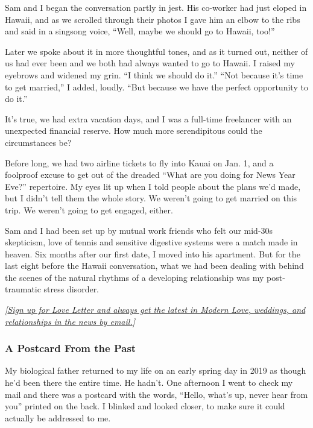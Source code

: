 Sam and I began the conversation partly in jest. His co-worker had just
eloped in Hawaii, and as we scrolled through their photos I gave him an
elbow to the ribs and said in a singsong voice, ``Well, maybe we should
go to Hawaii, too!''

Later we spoke about it in more thoughtful tones, and as it turned out,
neither of us had ever been and we both had always wanted to go to
Hawaii. I raised my eyebrows and widened my grin. ``I think we should do
it.'' ``Not because it's time to get married,'' I added, loudly. ``But
because we have the perfect opportunity to do it.''

It's true, we had extra vacation days, and I was a full-time freelancer
with an unexpected financial reserve. How much more serendipitous could
the circumstances be?

Before long, we had two airline tickets to fly into Kauai on Jan. 1, and
a foolproof excuse to get out of the dreaded ``What are you doing for
News Year Eve?'' repertoire. My eyes lit up when I told people about the
plans we'd made, but I didn't tell them the whole story. We weren't
going to get married on this trip. We weren't going to get engaged,
either.

Sam and I had been set up by mutual work friends who felt our mid-30s
skepticism, love of tennis and sensitive digestive systems were a match
made in heaven. Six months after our first date, I moved into his
apartment. But for the last eight before the Hawaii conversation, what
we had been dealing with behind the scenes of the natural rhythms of a
developing relationship was my post-traumatic stress disorder.

\emph{{[}}\href{https://www.nytimes3xbfgragh.onion/newsletters/love-letter?module=inline}{\emph{Sign
up for Love Letter and always get the latest in Modern Love, weddings,
and relationships in the news by email.}}\emph{{]}}

\hypertarget{a-postcard-from-the-past}{%
\subsubsection{A Postcard From the
Past}\label{a-postcard-from-the-past}}

My biological father returned to my life on an early spring day in 2019
as though he'd been there the entire time. He hadn't. One afternoon I
went to check my mail and there was a postcard with the words, ``Hello,
what's up, never hear from you'' printed on the back. I blinked and
looked closer, to make sure it could actually be addressed to me.

